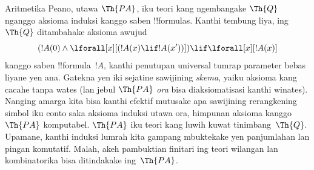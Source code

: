 \documentclass[../../../include/open-logic-section]{subfiles}
\begin{document}


Aritmetika Peano, utawa $\Th{PA}$, iku teori kang ngembangake
$\Th{Q}$ nganggo aksioma induksi kanggo saben !!{formula}s.
Kanthi tembung liya, ing $\Th{Q}$ ditambahake aksioma awujud
\[
(!A(0) \land \lforall[x][(!A(x) \lif !A(x'))]) \lif \lforall[x][!A(x)]
\]
kanggo saben !!{formula}~$!A$, kanthi penutupan universal tumrap parameter bebas liyane yen ana. Gatekna yen iki sejatine sawijining
\emph{skema}, yaiku aksioma kang cacahe tanpa wates (lan jebul
$\Th{PA}$ {\em ora} bisa diaksiomatisasi kanthi winates). Nanging
amarga kita bisa kanthi efektif mutusake apa sawijining rerangkening
simbol iku conto saka aksioma induksi utawa ora, himpunan aksioma
kanggo $\Th{PA}$ komputabel. $\Th{PA}$ iku teori kang luwih kuwat
tinimbang~$\Th{Q}$. Upamane, kanthi induksi lumrah kita gampang
mbuktekake yen panjumlahan lan pingan komutatif. Malah, akeh
pambuktian finitari ing teori wilangan lan kombinatorika bisa
ditindakake ing~$\Th{PA}$.
\end{document}
